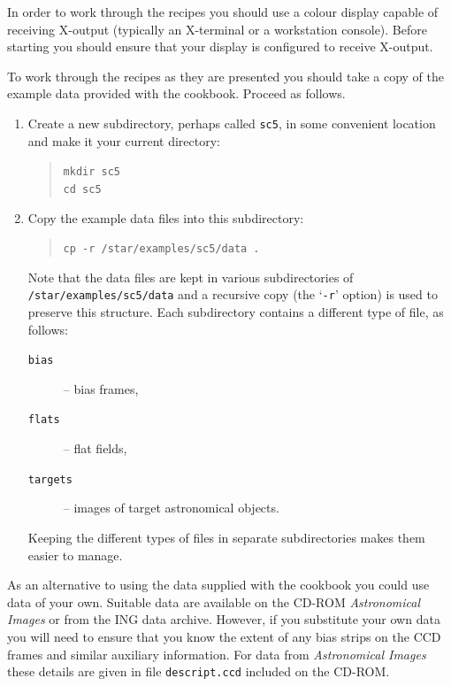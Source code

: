 \documentclass[twoside,11pt]{article}
\newcommand{\htmladdnormallink}[2]{#1}
\begin{document}
In order to work through the recipes you should use a colour display
capable of receiving X-output (typically an X-terminal or a workstation
console).  Before starting you should ensure that your display is configured
to receive X-output.

To work through the recipes as they are presented you should take a
copy of the example data provided with the cookbook.  Proceed as follows.

\begin{enumerate}

  \item Create a new subdirectory, perhaps called {\tt sc5}, in some
   convenient location and make it your current directory:

  \begin{quote}
   {\tt mkdir sc5 \\
   cd sc5}
  \end{quote}

  \item Copy the example data files into this subdirectory:

  \begin{quote}
   {\tt cp -r /star/examples/sc5/data .}
  \end{quote}

   Note that the data files are kept in various subdirectories of
   {\tt /star/examples/sc5/data} and a recursive copy (the `{\tt -r}'
   option) is used to preserve this structure.  Each subdirectory contains
   a different type of file, as follows:

  \begin{description}

    \item[{\tt bias~~~}] -- bias frames,

    \item[{\tt flats~~}] -- flat fields,

    \item[{\tt targets}] -- images of target astronomical objects.

  \end{description}

   Keeping the different types of files in separate subdirectories makes
   them easier to manage.

\end{enumerate}

As an alternative to using the data supplied with the cookbook you could
use data of your own.  Suitable data are available on the CD-ROM {\it
Astronomical Images}\/\cite{JAFFE98} or from the
\htmladdnormallink{ING data archive}{http://archive.ast.cam.ac.uk/}.
However, if you substitute your own data you will need to ensure that you
know the extent of any bias strips on the CCD frames and similar
auxiliary information.  For data from {\it Astronomical Images}\/ these
details are given in file {\tt descript.ccd} included on the CD-ROM.
\end{document}
